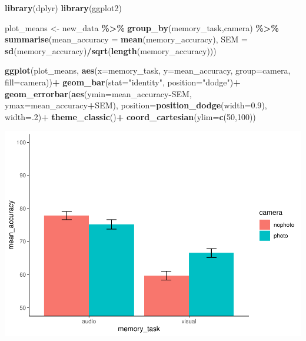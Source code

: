 \documentclass[
]{book}
\newenvironment{Shaded}{\begin{snugshade}}{\end{snugshade}}
\newcommand{\AttributeTok}[1]{\textcolor[rgb]{0.13,0.29,0.53}{#1}}
\newcommand{\DecValTok}[1]{\textcolor[rgb]{0.00,0.00,0.81}{#1}}
\newcommand{\FloatTok}[1]{\textcolor[rgb]{0.00,0.00,0.81}{#1}}
\newcommand{\FunctionTok}[1]{\textcolor[rgb]{0.13,0.29,0.53}{\textbf{#1}}}
\newcommand{\NormalTok}[1]{#1}
\newcommand{\OtherTok}[1]{\textcolor[rgb]{0.56,0.35,0.01}{#1}}
\newcommand{\SpecialCharTok}[1]{\textcolor[rgb]{0.81,0.36,0.00}{\textbf{#1}}}
\newcommand{\StringTok}[1]{\textcolor[rgb]{0.31,0.60,0.02}{#1}}
\begin{document}
\begin{Shaded}
\begin{Highlighting}[]
\FunctionTok{library}\NormalTok{(dplyr)}
\FunctionTok{library}\NormalTok{(ggplot2)}

\NormalTok{plot\_means }\OtherTok{\textless{}{-}}\NormalTok{ new\_data }\SpecialCharTok{\%\textgreater{}\%}
            \FunctionTok{group\_by}\NormalTok{(memory\_task,camera) }\SpecialCharTok{\%\textgreater{}\%}
            \FunctionTok{summarise}\NormalTok{(}\AttributeTok{mean\_accuracy =} \FunctionTok{mean}\NormalTok{(memory\_accuracy),}
                      \AttributeTok{SEM =} \FunctionTok{sd}\NormalTok{(memory\_accuracy)}\SpecialCharTok{/}\FunctionTok{sqrt}\NormalTok{(}\FunctionTok{length}\NormalTok{(memory\_accuracy)))}

\FunctionTok{ggplot}\NormalTok{(plot\_means, }\FunctionTok{aes}\NormalTok{(}\AttributeTok{x=}\NormalTok{memory\_task, }\AttributeTok{y=}\NormalTok{mean\_accuracy, }\AttributeTok{group=}\NormalTok{camera, }\AttributeTok{fill=}\NormalTok{camera))}\SpecialCharTok{+}
  \FunctionTok{geom\_bar}\NormalTok{(}\AttributeTok{stat=}\StringTok{"identity"}\NormalTok{, }\AttributeTok{position=}\StringTok{"dodge"}\NormalTok{)}\SpecialCharTok{+}
  \FunctionTok{geom\_errorbar}\NormalTok{(}\FunctionTok{aes}\NormalTok{(}\AttributeTok{ymin=}\NormalTok{mean\_accuracy}\SpecialCharTok{{-}}\NormalTok{SEM, }\AttributeTok{ymax=}\NormalTok{mean\_accuracy}\SpecialCharTok{+}\NormalTok{SEM), }
                \AttributeTok{position=}\FunctionTok{position\_dodge}\NormalTok{(}\AttributeTok{width=}\FloatTok{0.9}\NormalTok{),}
                \AttributeTok{width=}\NormalTok{.}\DecValTok{2}\NormalTok{)}\SpecialCharTok{+}
  \FunctionTok{theme\_classic}\NormalTok{()}\SpecialCharTok{+}
  \FunctionTok{coord\_cartesian}\NormalTok{(}\AttributeTok{ylim=}\FunctionTok{c}\NormalTok{(}\DecValTok{50}\NormalTok{,}\DecValTok{100}\NormalTok{))}
\end{Highlighting}
\end{Shaded}

\includegraphics{Statistics_Lab_files/figure-latex/unnamed-chunk-591-1.pdf}
\end{document}
